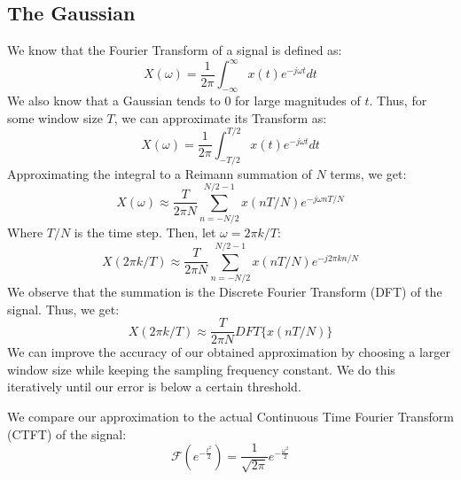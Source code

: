 \documentclass[12pt, a4paper]{article}
\begin{document}
\subsection{The Gaussian}
We know that the Fourier Transform of a signal is defined as:
\begin{equation*}
    X(\omega) = \frac{1}{2\pi} \int_{-\infty}^{\infty} x(t) e^{-j\omega t} dt
\end{equation*}
We also know that a Gaussian tends to 0 for large magnitudes of $t$. Thus, for some window size $T$,
we can approximate its Transform as:
\begin{equation*}
    X(\omega) = \frac{1}{2\pi} \int_{-T/2}^{T/2} x(t) e^{-j\omega t} dt
\end{equation*}
Approximating the integral to a Reimann summation of $N$ terms, we get:
\begin{equation*}
    X(\omega) \approx \frac{T}{2\pi N} \sum_{n = -N/2}^{N/2 - 1} x(nT/N) e^{-j\omega nT / N}
\end{equation*}
Where $T / N$ is the time step. Then, let $\omega = 2\pi k / T$:
\begin{equation*}
    X(2\pi k / T) \approx \frac{T}{2\pi N} \sum_{n = -N/2}^{N/2 - 1} x(nT/N) e^{-j2\pi kn/N}
\end{equation*}
We observe that the summation is the Discrete Fourier Transform (DFT) of the signal. Thus, we get:
\begin{equation*}
    X(2\pi k / T) \approx \frac{T}{2\pi N} DFT\{x(nT/N)\}
\end{equation*}
We can improve the accuracy of our obtained approximation by choosing a larger window size while keeping the
sampling frequency constant. We do this iteratively until our error is below a certain threshold.

We compare our approximation to the actual Continuous Time Fourier Transform (CTFT) of the signal:
\begin{equation*}
    \mathscr{F}(e^{-\frac{t^2}{2}}) = \frac{1}{\sqrt{2\pi}}e^{-\frac{\omega^2}{2}}
\end{equation*}
\end{document}
